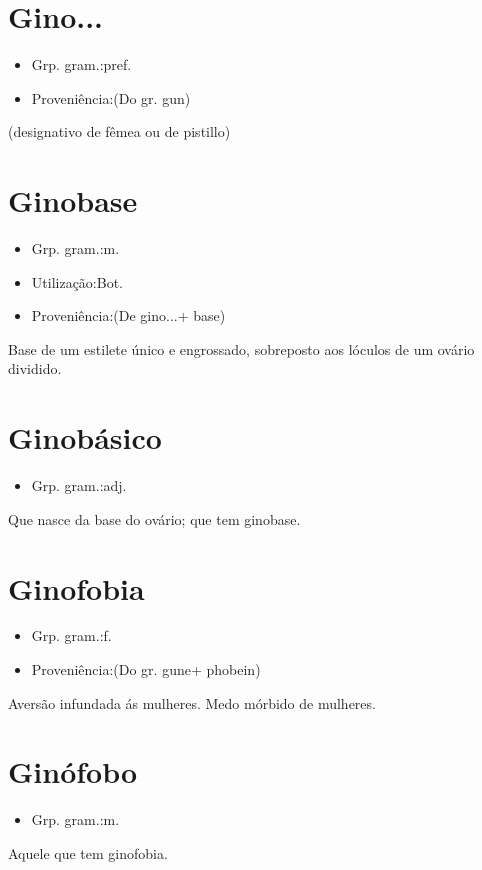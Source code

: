 \section{Gino...}
\begin{itemize}
\item {Grp. gram.:pref.}
\end{itemize}
\begin{itemize}
\item {Proveniência:(Do gr. \textunderscore gun\textunderscore )}
\end{itemize}
(designativo de fêmea ou de pistillo)
\section{Ginobase}
\begin{itemize}
\item {Grp. gram.:m.}
\end{itemize}
\begin{itemize}
\item {Utilização:Bot.}
\end{itemize}
\begin{itemize}
\item {Proveniência:(De \textunderscore gino...\textunderscore  + \textunderscore base\textunderscore )}
\end{itemize}
Base de um estilete único e engrossado, sobreposto aos lóculos de um ovário dividido.
\section{Ginobásico}
\begin{itemize}
\item {Grp. gram.:adj.}
\end{itemize}
Que nasce da base do ovário; que tem ginobase.
\section{Ginofobia}
\begin{itemize}
\item {Grp. gram.:f.}
\end{itemize}
\begin{itemize}
\item {Proveniência:(Do gr. \textunderscore gune\textunderscore  + \textunderscore phobein\textunderscore )}
\end{itemize}
Aversão infundada ás mulheres.
Medo mórbido de mulheres.
\section{Ginófobo}
\begin{itemize}
\item {Grp. gram.:m.}
\end{itemize}
Aquele que tem ginofobia.
